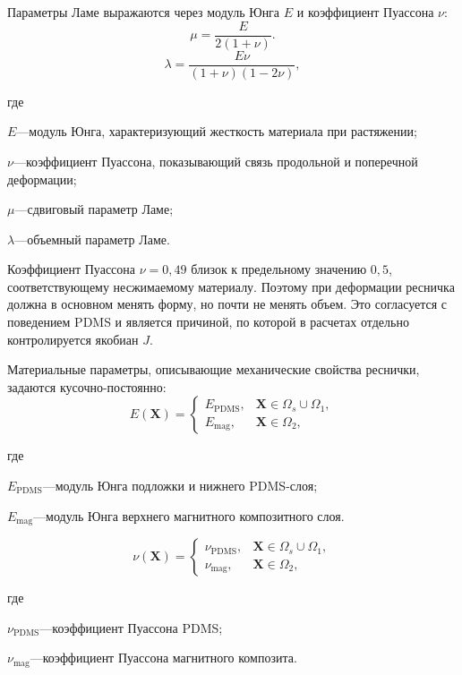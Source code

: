 \documentclass[14pt,a4paper]{extarticle}
\newif\ifwherefirst
\newcommand{\whereitem}[2]{%
    \ifwherefirst
        \wherefirstfalse
        #1\hspace{0.25em}---\hspace{0.25em}#2\par
    \else
        \noindent\hspace*{\parindent}\hphantom{где\enspace}#1\hspace{0.25em}---\hspace{0.25em}#2\par
    \fi
}
\newenvironment{whereblock}{%
    \vspace*{-1.55\baselineskip}%
    \begingroup
    \singlespacing
    \wherefirsttrue
    \par\indent где\enspace\ignorespaces
}{%
    \par\endgroup
    \par\vspace{\baselineskip}
}
\begin{document}
Параметры Ламе выражаются через модуль Юнга \(E\) и коэффициент Пуассона \(\nu\):
\begin{equation}
    \mu=\frac{E}{2(1+\nu)}.
\end{equation}
\begin{equation}
    \lambda=
    \frac{E\nu}{(1+\nu)(1-2\nu)},
\end{equation}
\begin{whereblock}
\whereitem{\(E\)}{модуль Юнга, характеризующий жесткость материала при растяжении;}
\whereitem{\(\nu\)}{коэффициент Пуассона, показывающий связь продольной и поперечной деформации;}
\whereitem{\(\mu\)}{сдвиговый параметр Ламе;}
\whereitem{\(\lambda\)}{объемный параметр Ламе.}
\end{whereblock}

Коэффициент Пуассона \(\nu=0,49\) близок к предельному значению \(0,5\), соответствующему несжимаемому материалу. Поэтому при деформации ресничка должна в основном менять форму, но почти не менять объем. Это согласуется с поведением PDMS и является причиной, по которой в расчетах отдельно контролируется якобиан \(J\).

Материальные параметры, описывающие механические свойства реснички, задаются кусочно-постоянно:
\begin{equation}
    E(\mathbf{X}) =
    \begin{cases}
        E_{\mathrm{PDMS}}, & \mathbf{X}\in \Omega_s \cup \Omega_1,\\
        E_{\mathrm{mag}}, & \mathbf{X}\in \Omega_2,
    \end{cases}
\end{equation}
\begin{whereblock}
\whereitem{\(E_{\mathrm{PDMS}}\)}{модуль Юнга подложки и нижнего PDMS-слоя;}
\whereitem{\(E_{\mathrm{mag}}\)}{модуль Юнга верхнего магнитного композитного слоя.}
\end{whereblock}
\begin{equation}
    \nu(\mathbf{X}) =
    \begin{cases}
        \nu_{\mathrm{PDMS}}, & \mathbf{X}\in \Omega_s \cup \Omega_1,\\
        \nu_{\mathrm{mag}}, & \mathbf{X}\in \Omega_2,
    \end{cases}
\end{equation}
\begin{whereblock}
\whereitem{\(\nu_{\mathrm{PDMS}}\)}{коэффициент Пуассона PDMS;}
\whereitem{\(\nu_{\mathrm{mag}}\)}{коэффициент Пуассона магнитного композита.}
\end{whereblock}
\end{document}
